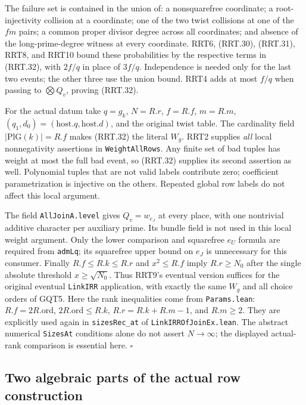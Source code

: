 \documentclass[11pt,a4paper]{article}
\numberwithin{equation}{section}
\theoremstyle{remark}\newtheorem{remark}[theorem]{Remark}
\begin{document}
The failure set is contained in the union of: a nonsquarefree
coordinate; a root-injectivity collision at a coordinate; one
of the two twist collisions at one of the $fm$ pairs; a common
proper divisor degree across all coordinates; and absence of
the long-prime-degree witness at every coordinate.  RRT6,
(RRT.30), (RRT.31), RRT8, and RRT10 bound these probabilities
by the respective terms in (RRT.32), with $2f/q$ in place of
$3f/q$.  Independence is needed only for the last two events;
the other three use the union bound.  RRT4 adds at most $f/q$
when passing to $\bigotimes Q_v$, proving (RRT.32).

For the actual datum take $q=g_k$, $N=R.r$, $f=R.f$,
$m=R.m$, $(q_1,\allowbreak{} d_0)=(\mathrm{host}.q,\mathrm{host}.d)$, and
the original twist table.  The cardinality field
$|\mathrm{PlG}(k)|=R.f$ makes (RRT.32) the literal $W_g$.
RRT2 supplies \emph{all} local nonnegativity assertions in
\texttt{Weight\allowbreak All\allowbreak Rows}.  Any finite set of bad tuples has
weight at most the full bad event, so (RRT.32) supplies its
second assertion as well.  Polynomial tuples that are not
valid labels contribute zero; coefficient parametrization is
injective on the others.  Repeated global row labels do not
affect this local argument.

The field \texttt{All\allowbreak Join\allowbreak A.\allowbreak level} gives $Q_v=w_{e_J}$ at
every place, with one nontrivial additive character per
auxiliary prime.  Its bundle field is not used in this local
weight argument.  Only the lower comparison and squarefree
$e_U$ formula are required from \texttt{adm\allowbreak Lq}; its
squarefree upper bound on $e_J$ is unnecessary for this
consumer.  Finally $R.f\le R.k\le R.r$ and
$x^2\le R.f$ imply $R.r\ge N_0$ after the single absolute
threshold $x\ge\sqrt{N_0}$.  Thus RRT9's eventual version
suffices for the original eventual \texttt{Link\allowbreak IRR}
application, with exactly the same $W_g$ and all choice orders
of GQT5.  Here the rank inequalities come from
\texttt{Params.\allowbreak lean}: $R.f=2R.\mathrm{ord}$,
$2R.\mathrm{ord}\le R.k$, $R.r=R.k+R.m-1$, and $R.m\ge2$.
They are explicitly used again in \texttt{sizes\allowbreak Rec\_\allowbreak at} of
\texttt{Link\allowbreak IRROf\allowbreak Join\allowbreak Ex.\allowbreak lean}.  The abstract numerical
\texttt{Sizes\allowbreak At} conditions alone do not assert $N\to\infty$;
the displayed actual-rank comparison is essential here.
\hfill$\square$

\subsection{Two algebraic parts of the actual row construction}
\end{document}

